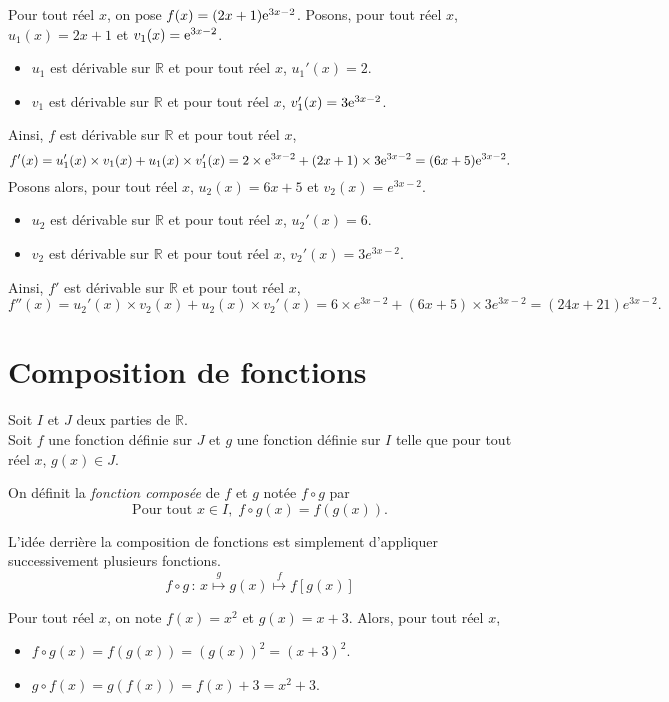 \documentclass[11pt,fleqn, openany]{book} %
\begin{document}
\begin{example}Pour tout réel $x$, on pose $f(x)=(2x+1)\mathrm{e}^{3x-2}$. Posons, pour tout réel $x$, $u_1(x)=2x+1$ et $v_1(x)=\mathrm{e}^{3x-2}$.
\begin{itemize}
\item $u_1$ est dérivable sur $\mathbb{R}$ et pour tout réel $x$, $u_1'(x)=2$.
\item $v_1$ est dérivable sur $\mathbb{R}$ et pour tout réel $x$, $v_1'(x)=3\mathrm{e}^{3x-2}$.
\end{itemize}
Ainsi, $f$ est dérivable sur $\mathbb{R}$ et pour tout réel $x$,
\[ f'(x)=u_1'(x) \times v_1(x) + u_1(x) \times v_1'(x) =  2 \times \mathrm{e}^{3x-2} + (2x+1) \times 3\mathrm{e}^{3x-2}=(6x+5)\mathrm{e}^{3x-2}.\]
Posons alors, pour tout réel $x$, $u_2(x)=6x+5$ et $v_2(x)=e^{3x-2}$.
\begin{itemize}
\item $u_2$ est dérivable sur $\mathbb{R}$ et pour tout réel $x$, $u_2'(x)=6$.
\item $v_2$ est dérivable sur $\mathbb{R}$ et pour tout réel $x$, $v_2'(x)=3e^{3x-2}$.
\end{itemize}
Ainsi, $f'$ est dérivable sur $\mathbb{R}$ et pour tout réel $x$,
\[ f''(x)=u_2'(x) \times v_2(x) + u_2(x) \times v_2'(x) =  6 \times e^{3x-2} + (6x+5) \times 3e^{3x-2}=(24x+21)e^{3x-2}.\]
\end{example}



\section{Composition de fonctions}


\begin{definition}  Soit $I$ et $J$ deux parties de $\mathbb{R}$.\\ Soit $f$ une fonction définie sur $J$ et $g$ une fonction définie sur $I$ telle que pour tout réel $x$, $g(x) \in J$.

On définit la \textit{fonction composée} de $f$ et $g$ notée $f \circ g$ par 
\[ \text{Pour tout } x \in I, \; f \circ g (x)= f(g(x)).\]\end{definition}
 L'idée derrière la composition de fonctions est simplement d'appliquer successivement plusieurs fonctions.
 \[f \circ g \,:\, x \overset{g}{\longmapsto} g(x) \overset{f}{\longmapsto} f[g(x)]\]

\begin{example} Pour tout réel $x$, on note $f(x)=x^2$ et $g(x)=x+3$. Alors, pour tout réel $x$,
\begin{itemize}
\item $f \circ g (x)= f(g(x))=(g(x))^2=(x+3)^2$.
\item $g \circ f(x)=g(f(x)) = f(x)+3=x^2+3$.
\end{itemize}\end{example}
\end{document}
